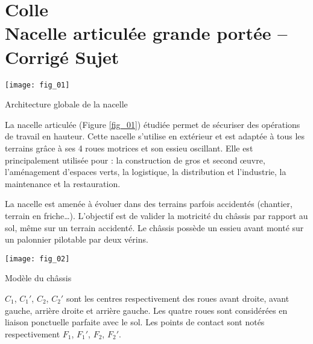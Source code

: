 \chapter*{Colle  \\ 
Nacelle articulée grande portée -- 
\ifprof Corrigé \else Sujet \fi}

\iflivret {} \else
\ifprof  {} \else \fi
\fi

\setcounter{question}{0}






\ifprof
\else
\begin{marginfigure}
\centering
\texttt{[image: fig\_01]}
\caption{Architecture globale de la nacelle \label{fig_01}}
\end{marginfigure}

La nacelle articulée (Figure \ref{fig_01}) étudiée permet de sécuriser des opérations de travail en hauteur. 
Cette nacelle s’utilise en extérieur et est adaptée à tous les terrains grâce à ses 4 roues motrices 
et son essieu oscillant. Elle est principalement utilisée pour : la construction de gros et second 
œuvre, l’aménagement d’espaces verts, la logistique, la distribution et l’industrie, la maintenance 
et la restauration. 


La nacelle est amenée à évoluer dans des terrains parfois accidentés (chantier, terrain en friche…).
L’objectif est de valider la motricité du châssis par rapport au sol, même sur un terrain accidenté. 
Le châssis possède un essieu avant monté sur un palonnier pilotable par deux vérins. 

\begin{marginfigure}
\centering
\texttt{[image: fig\_02]}
\caption{Modèle du châssis \label{fig_02}}
\end{marginfigure}


$C_1$, $C_1'$, $C_2$, $C_2'$ sont les centres respectivement des roues avant droite, avant gauche, arrière droite 
et arrière gauche. Les quatre roues sont considérées en liaison ponctuelle parfaite avec le sol. Les 
points de contact sont notés respectivement $F_1$, $F_1'$, $F_2$, $F_2'$. 
\fi


